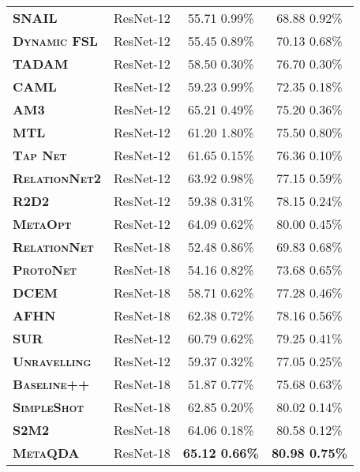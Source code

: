\documentclass[10pt,twocolumn,letterpaper]{article}
\begin{document}
\begin{table}[h]
{\begin{tabular}{@{} llcc @{}}
\midrule

\textbf{\textsc{SNAIL}} \cite{santoro2017simple} & ResNet-12 & 55.71  0.99\% & 68.88  0.92\% \\ 
\textbf{\textsc{Dynamic FSL}} \cite{gidaris2018dynamic} & ResNet-12& 55.45  0.89\% & 70.13  0.68\% \\ 
\textbf{\textsc{TADAM}} \cite{oreshkin2018tadam} & ResNet-12 & 58.50  0.30\% & {76.70  0.30\%} \\
\textbf{\textsc{CAML}} \cite{jiang2019CAML} & ResNet-12 &  59.23  0.99\% & 72.35  0.18\% \\
\textbf{\textsc{AM3}} \cite{xing2019am3} & ResNet-12 & 65.21  0.49\% & 75.20  0.36\% \\
\textbf{\textsc{MTL}} \cite{sun2019meta} & ResNet-12 & 61.20  1.80\% & 75.50  0.80\% \\
\textbf{\textsc{Tap Net}} \cite{yoon2019tapnet} & ResNet-12 & 61.65  0.15\% & 76.36  0.10\% \\
\textbf{\textsc{RelationNet2}}\cite{xueting2020dcn} & ResNet-12 & 63.92  0.98\% & 77.15  0.59\% \\
\textbf{\textsc{R2D2}}\cite{bertinetto2019R2D2} & ResNet-12 & 59.38  0.31\% & 78.15  0.24\% \\
\textbf{\textsc{MetaOpt}} \cite{lee2019meta} & ResNet-12 & 64.09  0.62\% & 80.00  0.45\% \\

\textbf{\textsc{RelationNet}} \cite{chen2019closerfewshot} & ResNet-18 &  52.48  0.86\% & 69.83  0.68\% \\
\textbf{\textsc{ProtoNet}} \cite{chen2019closerfewshot} & ResNet-18 &  54.16  0.82\% & 73.68  0.65\% \\
\textbf{\textsc{DCEM}} \cite{dvornik2019dcem} & ResNet-18 &  58.71  0.62\% & 77.28  0.46\% \\
\textbf{\textsc{AFHN}} \cite{li2020afhn} & ResNet-18 &  62.38  0.72\% & 78.16  0.56\% \\

\rowcolor{Gray} \textbf{\textsc{SUR}}\cite{dvornik2020selecting} & ResNet-12 & 60.79  0.62\% & 79.25  0.41\% \\
\rowcolor{Gray} \textbf{\textsc{Unravelling}}\cite{goldblum2020unraveling} & ResNet-12
& {59.37  0.32\%} & {77.05  0.25\%} \\
\rowcolor{Gray} \textbf{\textsc{Baseline++}} \cite{chen2019closerfewshot} & ResNet-18 &  51.87  0.77\% & 75.68  0.63\% \\ 
\rowcolor{Gray} \textbf{\textsc{SimpleShot}}\cite{wang2019simpleshot} & ResNet-18 & {62.85  0.20\%} & {80.02  0.14\%} \\
\rowcolor{Gray} \textbf{\textsc{S2M2}} \cite{mangla2020charting} & ResNet-18 &  64.06  0.18\% & 80.58  0.12\% \\
\rowcolor{Gray} \textbf{\textsc{MetaQDA}} & ResNet-18 & \textbf{ 65.12  0.66\%} & \textbf{80.98  0.75\%} \\ 


\end{tabular}}
\end{table}
\end{document}
